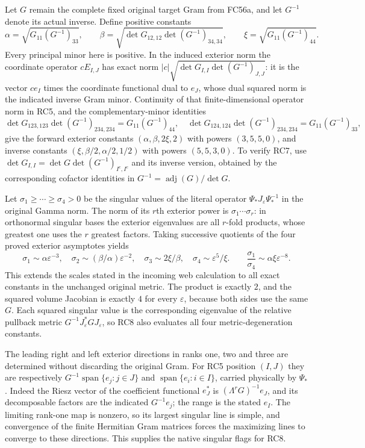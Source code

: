 Let $G$ remain the complete fixed original target Gram from FC56a,
and let $G^{-1}$ denote its actual inverse. Define positive constants
\[
 \alpha=\sqrt{G_{11}(G^{-1})_{33}},\qquad
 \beta=\sqrt{\det G_{12,12}\det(G^{-1})_{34,34}},\qquad
 \xi=\sqrt{G_{11}(G^{-1})_{44}}. \tag{RC6}
\]
Every principal minor here is positive. In the induced exterior
norm the coordinate operator $cE_{I,J}$ has exact norm
$|c|\sqrt{\det G_{I,I}\det(G^{-1})_{J,J}}$: it is the vector
$ce_I$ times the coordinate functional dual to $e_J$, whose
dual squared norm is the indicated inverse Gram minor.
Continuity of that finite-dimensional operator norm in RC5, and
the complementary-minor identities
\[
 \det G_{123,123}\det(G^{-1})_{234,234}
       =G_{11}(G^{-1})_{44},\quad
 \det G_{124,124}\det(G^{-1})_{234,234}
       =G_{11}(G^{-1})_{33}, \tag{RC7}
\]
give the forward exterior constants $(\alpha,\beta,2\xi,2)$
with powers $(3,5,5,0)$, and inverse constants
$(\xi,\beta/2,\alpha/2,1/2)$ with powers $(5,5,3,0)$.
To verify RC7, use
$\det G_{I,I}=\det G\det(G^{-1})_{I^c,I^c}$ and its inverse
version, obtained by the corresponding cofactor identities in
$G^{-1}=\operatorname{adj}(G)/\det G$.

Let $\sigma_1\ge\cdots\ge\sigma_4>0$ be the singular values of
the literal operator $\Psi_*J_\varepsilon\Psi_*^{-1}$ in the
original Gamma norm. The norm of its $r$th exterior power is
$\sigma_1\cdots\sigma_r$: in orthonormal singular bases the
exterior eigenvalues are all $r$-fold products, whose greatest
one uses the $r$ greatest factors. Taking successive quotients
of the four proved exterior asymptotes yields
\[
 \boxed{
 \sigma_1\sim\alpha\varepsilon^{-3},\quad
 \sigma_2\sim(\beta/\alpha)\varepsilon^{-2},\quad
 \sigma_3\sim2\xi/\beta,\quad
 \sigma_4\sim\varepsilon^5/\xi.}
 \qquad
 \frac{\sigma_1}{\sigma_4}\sim\alpha\xi\varepsilon^{-8}.
 \tag{RC8}
\]
This extends the scales stated in the incoming web calculation to
all exact constants in the unchanged original metric. The product
is exactly $2$, and the squared volume Jacobian is exactly $4$
for every $\varepsilon$, because both sides use the same $G$.
Each squared singular value is the corresponding eigenvalue of
the relative pullback metric $G^{-1}J_\varepsilon^*GJ_\varepsilon$,
so RC8 also evaluates all four metric-degeneration constants.

The leading right and left exterior directions in ranks one,
two and three are determined without discarding the original
Gram. For RC5 position $(I,J)$ they are respectively
$G^{-1}\operatorname{span}\{e_j:j\in J\}$ and
$\operatorname{span}\{e_i:i\in I\}$, carried physically by
$\Psi_*$. Indeed the Riesz vector of the coefficient functional
$e_J^*$ is $(\Lambda^rG)^{-1}e_J$, and its decomposable factors
are the indicated $G^{-1}e_j$; the range is the stated $e_I$.
The limiting rank-one map is nonzero, so its largest singular
line is simple, and convergence of the finite Hermitian Gram
matrices forces the maximizing lines to converge to these
directions. This supplies the native singular flags for RC8.

